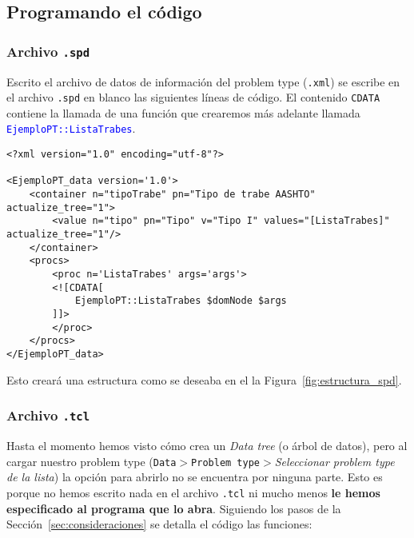 \documentclass[10pt, a4paper, twocolumn]{article}
\begin{document}
\subsection{Programando el código}

\subsubsection{Archivo \texttt{.spd}}

Escrito el archivo de datos de información del problem type (\texttt{.xml}) se escribe en el archivo \texttt{.spd} en blanco las siguientes líneas de código. El contenido \texttt{CDATA} contiene la llamada de una función que crearemos más adelante llamada \textcolor{blue}{\texttt{EjemploPT::ListaTrabes}}.

\lstset{language=XML} 
\begin{lstlisting}
<?xml version="1.0" encoding="utf-8"?>

<EjemploPT_data version='1.0'>
	<container n="tipoTrabe" pn="Tipo de trabe AASHTO" actualize_tree="1">
		<value n="tipo" pn="Tipo" v="Tipo I" values="[ListaTrabes]" actualize_tree="1"/>
  	</container>
  	<procs>
    	<proc n='ListaTrabes' args='args'>
      	<![CDATA[
        	EjemploPT::ListaTrabes $domNode $args
      	]]>
    	</proc>
  	</procs>
</EjemploPT_data>
\end{lstlisting}

Esto creará una estructura como se deseaba en el la Figura~\ref{fig:estructura_spd}.

\subsubsection{Archivo \texttt{.tcl}}

Hasta el momento hemos visto cómo crea un \textit{Data tree} (o árbol de datos), pero al cargar nuestro problem type (\texttt{Data$>$Problem type$>$}\textit{Seleccionar problem type de la lista}) la opción para abrirlo no se encuentra por ninguna parte. Esto es porque no hemos escrito nada en el archivo \texttt{.tcl} ni mucho menos \textbf{le hemos especificado al programa que lo abra}. Siguiendo los pasos de la Sección~\ref{sec:consideraciones} se detalla el código las funciones:
\end{document}
